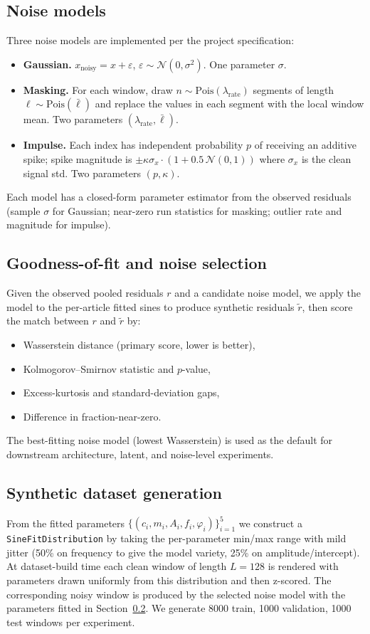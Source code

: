 \documentclass[11pt]{article}
\begin{document}
\subsection{Noise models}\label{sec:noise}
Three noise models are implemented per the project specification:
\begin{itemize}
  \item \textbf{Gaussian.} $x_{\text{noisy}} = x + \varepsilon$, $\varepsilon \sim \mathcal{N}(0, \sigma^2)$. One parameter $\sigma$.
  \item \textbf{Masking.} For each window, draw $n \sim \mathrm{Pois}(\lambda_{\text{rate}})$ segments of length $\ell \sim \mathrm{Pois}(\bar{\ell})$ and replace the values in each segment with the local window mean. Two parameters $(\lambda_{\text{rate}}, \bar{\ell})$.
  \item \textbf{Impulse.} Each index has independent probability $p$ of receiving an additive spike; spike magnitude is $\pm \kappa\sigma_x \cdot (1 + 0.5\,\mathcal{N}(0,1))$ where $\sigma_x$ is the clean signal std. Two parameters $(p, \kappa)$.
\end{itemize}
Each model has a closed-form parameter estimator from the observed residuals (sample $\sigma$ for Gaussian; near-zero run statistics for masking; outlier rate and magnitude for impulse).

\subsection{Goodness-of-fit and noise selection}\label{sec:noiseselect}
Given the observed pooled residuals $r$ and a candidate noise model, we apply the model to the per-article fitted sines to produce synthetic residuals $\tilde{r}$, then score the match between $r$ and $\tilde{r}$ by:
\begin{itemize}
  \item Wasserstein distance (primary score, lower is better),
  \item Kolmogorov--Smirnov statistic and $p$-value,
  \item Excess-kurtosis and standard-deviation gaps,
  \item Difference in fraction-near-zero.
\end{itemize}
The best-fitting noise model (lowest Wasserstein) is used as the default for downstream architecture, latent, and noise-level experiments.

\subsection{Synthetic dataset generation}
From the fitted parameters $\{(c_i, m_i, A_i, f_i, \varphi_i)\}_{i=1}^5$ we construct a \texttt{SineFitDistribution} by taking the per-parameter min/max range with mild jitter (50\% on frequency to give the model variety, 25\% on amplitude/intercept). At dataset-build time each clean window of length $L = 128$ is rendered with parameters drawn uniformly from this distribution and then z-scored. The corresponding noisy window is produced by the selected noise model with the parameters fitted in Section~\ref{sec:noiseselect}. We generate 8000 train, 1000 validation, 1000 test windows per experiment.
\end{document}
